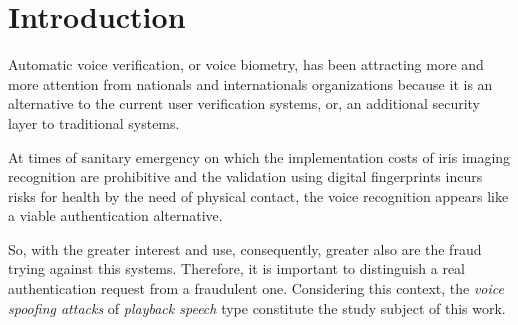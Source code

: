 \vspace*{+5pt}
\section{Introduction}
\label{introduction}
		\par Automatic voice verification, or voice biometry, has been attracting more and more attention from nationals and internationals organizations because it is an alternative to the current user verification systems, or, an additional security layer to  traditional systems.
		
		\par At times of sanitary emergency on which the implementation costs of iris imaging recognition are prohibitive and the validation using digital fingerprints incurs risks for health by the need of physical contact, the voice recognition appears like a viable authentication alternative.
				
		\par So, with the greater interest and use, consequently, greater also are the fraud trying against this systems. Therefore, it is important to distinguish a real authentication request from a fraudulent one. Considering this context, the \textit{voice spoofing attacks} of \textit{playback speech} type constitute the study subject of this work.